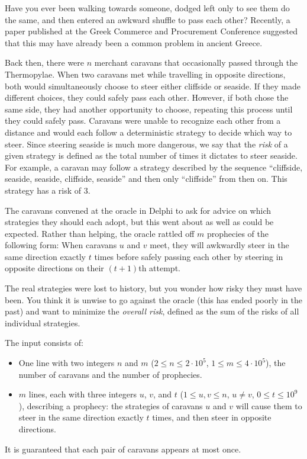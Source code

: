 
\newcommand{\maxn}{2 \cdot 10^5}
\newcommand{\maxm}{4 \cdot 10^5}
\newcommand{\maxt}{10^9}


Have you ever been walking towards someone, dodged left only to see them do the same, and then entered an awkward shuffle to pass each other?
Recently, a paper published at the Greek Commerce and Procurement Conference suggested that this may have already been a common problem in ancient Greece.

Back then, there were $n$ merchant caravans that occasionally passed through the Thermopylae.
When two caravans met while travelling in opposite directions, both would simultaneously choose to steer either cliffside or seaside.
If they made different choices, they could safely pass each other.
However, if both chose the same side, they had another opportunity to choose, repeating this process until they could safely pass.
Caravans were unable to recognize each other from a distance and would each follow a deterministic strategy to decide which way to steer.
Since steering seaside is much more dangerous, we say that the \emph{risk} of a given strategy is defined as the total number of times it dictates to steer seaside.
For example, a caravan may follow a strategy described by the sequence ``cliffside, seaside, seaside, cliffside, seaside'' and then only ``cliffside'' from then on.
This strategy has a risk of $3$.

The caravans convened at the oracle in Delphi to ask for advice on which strategies they should each adopt, but this went about as well as could be expected. Rather than helping, the oracle rattled off $m$ prophecies of the following form: When caravans $u$ and $v$ meet, they will awkwardly steer in the same direction exactly $t$ times before safely passing each other by steering in opposite directions on their $(t + 1)$th attempt.

The real strategies were lost to history, but you wonder how risky they must have been. You think it is unwise to go against the oracle (this has ended poorly in the past) and want to minimize the \emph{overall risk}, defined as the sum of the risks of all individual strategies.

\begin{Input}
The input consists of:
\begin{itemize}
	\item One line with two integers $n$ and $m$ ($2\leq n\leq \maxn$, $1\leq m\leq\maxm$), the number of caravans and the number of prophecies.
	\item $m$ lines, each with three integers $u$, $v$, and $t$ ($1\leq u, v\leq n$, $u\neq v$, $0\leq t\leq \maxt$), describing a prophecy:
	the strategies of caravans $u$ and $v$ will cause them to steer in the same direction exactly $t$ times, and then steer in opposite directions.
\end{itemize}
It is guaranteed that each pair of caravans appears at most once.
\end{Input}

